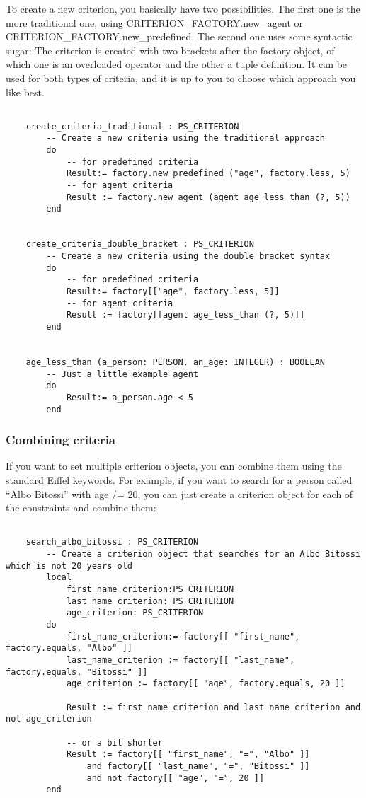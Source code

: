 To create a new criterion, you basically have two possibilities.
The first one is the more traditional one, using CRITERION\_FACTORY.new\_agent or CRITERION\_FACTORY.new\_predefined.
The second one uses some syntactic sugar:
The criterion is created with two brackets after the factory object, of which one is an overloaded operator and the other a tuple definition.
It can be used for both types of criteria, and it is up to you to choose which approach you like best.

\begin{lstlisting}[language=OOSC2Eiffel, captionpos=b, caption={The CRITERION\_FACTORY interface}, label={lst:factory_interface}]

	create_criteria_traditional : PS_CRITERION
		-- Create a new criteria using the traditional approach
		do
			-- for predefined criteria
			Result:= factory.new_predefined ("age", factory.less, 5)
			-- for agent criteria
			Result := factory.new_agent (agent age_less_than (?, 5))
		end


	create_criteria_double_bracket : PS_CRITERION
		-- Create a new criteria using the double bracket syntax
		do
			-- for predefined criteria
			Result:= factory[["age", factory.less, 5]]
			-- for agent criteria
			Result := factory[[agent age_less_than (?, 5)]]
		end			


	age_less_than (a_person: PERSON, an_age: INTEGER) : BOOLEAN
		-- Just a little example agent
		do
			Result:= a_person.age < 5
		end

\end{lstlisting}



\subsubsection{Combining criteria}

If you want to set multiple criterion objects, you can combine them using the standard Eiffel keywords. 
For example, if you want to search for a person called ``Albo Bitossi'' with age /= 20, you can just create a criterion object for each of the constraints and combine them:  

\begin{lstlisting}[language=OOSC2Eiffel, captionpos=b, caption={}, label={lst:search_albo_bitossi}]

	search_albo_bitossi : PS_CRITERION
		-- Create a criterion object that searches for an Albo Bitossi which is not 20 years old
		local
			first_name_criterion:PS_CRITERION
			last_name_criterion: PS_CRITERION
			age_criterion: PS_CRITERION
		do
			first_name_criterion:= factory[[ "first_name", factory.equals, "Albo" ]]
			last_name_criterion := factory[[ "last_name", factory.equals, "Bitossi" ]]
			age_criterion := factory[[ "age", factory.equals, 20 ]]
			
			Result := first_name_criterion and last_name_criterion and not age_criterion

			-- or a bit shorter
			Result := factory[[ "first_name", "=", "Albo" ]] 
				and factory[[ "last_name", "=", "Bitossi" ]] 
				and not factory[[ "age", "=", 20 ]]
		end
\end{lstlisting}

